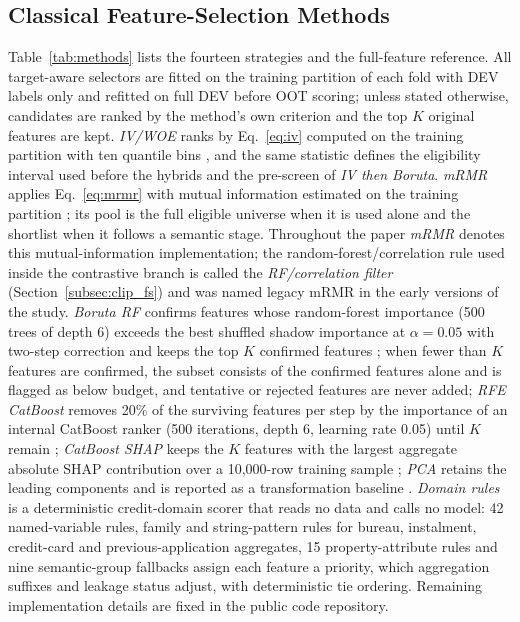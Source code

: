 \documentclass[final,5p,twocolumn]{elsarticle}
\newcommand{\Kfeat}{K}
\begin{document}
\subsection{Classical Feature-Selection Methods}
\label{subsec:classical_fs}

Table~\ref{tab:methods} lists the fourteen strategies and the full-feature reference. All target-aware selectors are fitted on the training partition of each fold with DEV labels only and refitted on full DEV before OOT scoring; unless stated otherwise, candidates are ranked by the method's own criterion and the top $\Kfeat$ original features are kept. \emph{IV/WOE} ranks by Eq.~\eqref{eq:iv} computed on the training partition with ten quantile bins \cite{siddiqi2006}, and the same statistic defines the eligibility interval used before the hybrids and the pre-screen of \emph{IV then Boruta}. \emph{mRMR} applies Eq.~\eqref{eq:mrmr} with mutual information estimated on the training partition \cite{peng2005,kraskov2004,ross2014}; its pool is the full eligible universe when it is used alone and the shortlist when it follows a semantic stage. Throughout the paper \emph{mRMR} denotes this mutual-information implementation; the random-forest/correlation rule used inside the contrastive branch is called the \emph{RF/correlation filter} (Section~\ref{subsec:clip_fs}) and was named legacy mRMR in the early versions of the study. \emph{Boruta RF} confirms features whose random-forest importance (500 trees of depth 6) exceeds the best shuffled shadow importance at $\alpha=0.05$ with two-step correction and keeps the top $\Kfeat$ confirmed features \cite{kursa2010,breiman2001}; when fewer than $\Kfeat$ features are confirmed, the subset consists of the confirmed features alone and is flagged as below budget, and tentative or rejected features are never added; \emph{RFE CatBoost} removes 20\% of the surviving features per step by the importance of an internal CatBoost ranker (500 iterations, depth 6, learning rate 0.05) until $\Kfeat$ remain \cite{guyon2002}; \emph{CatBoost SHAP} keeps the $\Kfeat$ features with the largest aggregate absolute SHAP contribution over a 10,000-row training sample \cite{lundberg2017}; \emph{PCA} retains the leading components and is reported as a transformation baseline \cite{jolliffe2016}. \emph{Domain rules} is a deterministic credit-domain scorer that reads no data and calls no model: 42 named-variable rules, family and string-pattern rules for bureau, instalment, credit-card and previous-application aggregates, 15 property-attribute rules and nine semantic-group fallbacks assign each feature a priority, which aggregation suffixes and leakage status adjust, with deterministic tie ordering. Remaining implementation details are fixed in the public code repository.
\end{document}
